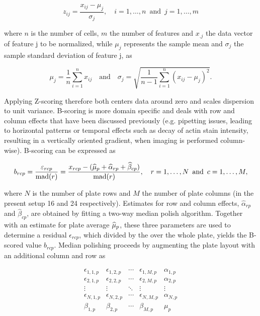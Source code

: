 \begin{equation}
  z_{ij} = \frac{x_{ij} - \mu_j}{\sigma_j}, \quad i=1, \dotsc, n \enspace \text{and} \enspace j=1, \dotsc, m
\end{equation}

where $n$ is the number of cells, $m$ the number of features and $x_{.j}$ the data vector of feature j to be normalized, while $\mu_j$ represents the sample mean and $\sigma_j$ the sample standard deviation of feature j, as

\begin{equation}
  \mu_j = \frac{1}{n} \sum_{i=1}^n x_{ij} \quad \text{and} \quad \sigma_j = \sqrt{\frac{1}{n-1} \sum_{i=1}^n (x_{ij}-\mu_j)^2}.
\end{equation}

Applying Z-scoring therefore both centers data around zero and scales dispersion to unit variance. B-scoring is more domain specific and deals with row and column effects that have been discussed previously (e.g. pipetting issues, leading to horizontal patterns or temporal effects such as decay of actin stain intensity, resulting in a vertically oriented gradient, when imaging is performed column-wise). B-scoring can be expressed as

\begin{equation}
  b_{rcp} = \frac{\varepsilon_{rcp}}{\operatorname{mad}(r)} = \frac{x_{rcp} - (\widehat{\mu}_p + \widehat{\alpha}_{rp} + \widehat{\beta}_{cp})}{\operatorname{mad}(r)}, \quad r=1, \dotsc, N \enspace \text{and} \enspace c=1, \dotsc, M,
\end{equation}

where $N$ is the number of plate rows and $M$ the number of plate columns (in the present setup 16 and 24 respectively). Estimates for row and column effects, $\widehat{\alpha}_{rp}$ and $\widehat{\beta}_{cp}$, are obtained by fitting a two-way median polish algorithm. Together with an estimate for plate average $\widehat{\mu}_p$, these three parameters are used to determine a residual $\epsilon_{rcp}$, which divided by the  over the whole plate, yields the B-scored value $b_{rcp}$. Median polishing proceeds by augmenting the plate layout with an additional column and row as

\begin{equation*}
  \begin{array}{cccc|c}
    \epsilon_{1,1,p} & \epsilon_{1,2,p} & \cdots & \epsilon_{1,M,p} & \alpha_{1,p} \\
    \epsilon_{2,1,p} & \epsilon_{2,2,p} & \cdots & \epsilon_{2,M,p} & \alpha_{2,p} \\
    \vdots  & \vdots  & \ddots & \vdots & \vdots \\
    \epsilon_{N,1,p} & \epsilon_{N,2,p} & \cdots & \epsilon_{N,M,p} & \alpha_{N,p} \\
    \hline
    \beta_{1,p} & \beta_{2,p} & \cdots & \beta_{M,p} & \mu_{p} \\
  \end{array}
\end{equation*}

